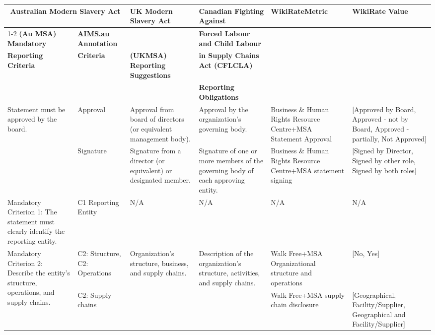 \documentclass{article}
\begin{document}
\begin{landscape}
\begin{table}[ht]
\centering
\scriptsize
\begin{tabular}{p{3cm}p{2cm}p{2.5cm}p{2.5cm}p{2.5cm}p{2cm}}
\toprule
\multicolumn{2}{c}{\textbf{Australian Modern Slavery Act}} & 
\multirow{2}{*}{\textbf{UK Modern Slavery Act}} & 
\multirow{2}{*}{\textbf{Canadian Fighting Against}} & 
\multirow{2}{*}{\textbf{WikiRateMetric}} & 
\multirow{2}{*}{\textbf{WikiRate Value}} \\
\cmidrule(lr){1-2}
\textbf{(Au MSA) Mandatory} & \textbf{\uline{AIMS.au} Annotation} & 
& \textbf{Forced Labour and Child Labour} & & \\
\textbf{Reporting Criteria} & \textbf{Criteria} & 
\textbf{(UKMSA) Reporting Suggestions} & 
\textbf{in Supply Chains Act (CFLCLA)} & & \\
& & & \textbf{Reporting Obligations} & & \\
\midrule

\multirow{2}{*}{Statement must be approved by the board.} 
& Approval & Approval from board of directors (or equivalent management body). 
& Approval by the organization's governing body. 
& Business \& Human Rights Resource Centre+MSA Statement Approval 
& [Approved by Board, Approved - not by Board, Approved - partially, Not Approved] \\

\multirow{2}{*}{Signed by a responsible member of the organization.} 
& Signature & Signature from a director (or equivalent) or designated member. 
& Signature of one or more members of the governing body of each approving entity. 
& Business \& Human Rights Resource Centre+MSA statement signing 
& [Signed by Director, Signed by other role, Signed by both roles] \\

Mandatory Criterion 1: The statement must clearly identify the reporting entity. 
& C1 Reporting Entity & N/A & N/A & N/A & N/A \\

\multirow{3}{*}{Mandatory Criterion 2: Describe the entity's structure, operations, and supply chains.} 
& C2: Structure, C2: Operations 
& Organization's structure, business, and supply chains. 
& Description of the organization's structure, activities, and supply chains. 
& Walk Free+MSA Organizational structure and operations 
& [No, Yes] \\

& C2: Supply chains & & 
& Walk Free+MSA supply chain disclosure 
& [Geographical, Facility/Supplier, Geographical and Facility/Supplier] \\


\end{tabular}
\end{table}
\end{landscape}
\end{document}
